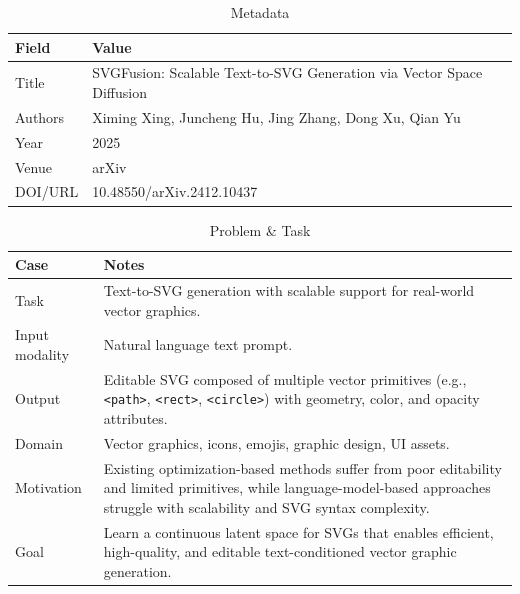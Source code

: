 \begin{table}[h!]
\centering
\caption{Metadata}
\begin{tabular}{|l|l|}
\hline
\textbf{Field} & \textbf{Value} \\ \hline
Title & SVGFusion: Scalable Text-to-SVG Generation via Vector Space Diffusion \\ \hline
Authors & Ximing Xing, Juncheng Hu, Jing Zhang, Dong Xu, Qian Yu \\ \hline
Year & 2025 \\ \hline
Venue & arXiv \\ \hline
DOI/URL & 10.48550/arXiv.2412.10437 \\ \hline
\end{tabular}
\end{table}

\begin{table}[h!]
\centering
\caption{Problem \& Task}
\begin{tabular}{|l|p{10cm}|}
\hline
\textbf{Case} & \textbf{Notes} \\ \hline
Task &
Text-to-SVG generation with scalable support for real-world vector graphics. \\ \hline
Input modality &
Natural language text prompt. \\ \hline
Output &
Editable SVG composed of multiple vector primitives (e.g., \texttt{<path>}, \texttt{<rect>}, \texttt{<circle>}) with geometry, color, and opacity attributes. \\ \hline
Domain &
Vector graphics, icons, emojis, graphic design, UI assets. \\ \hline
Motivation &
Existing optimization-based methods suffer from poor editability and limited primitives, while language-model-based approaches struggle with scalability and SVG syntax complexity. \\ \hline
Goal &
Learn a continuous latent space for SVGs that enables efficient, high-quality, and editable text-conditioned vector graphic generation. \\ \hline
\end{tabular}
\end{table}

